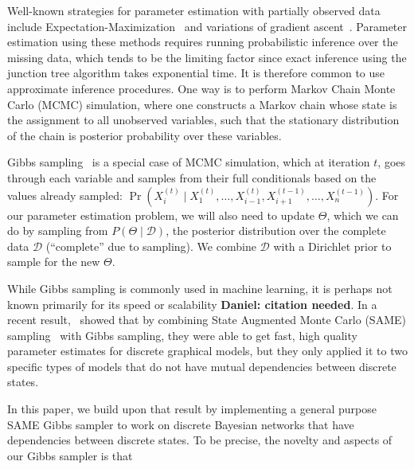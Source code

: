 \documentclass{article} %
\begin{document}
Well-known strategies for parameter estimation with partially observed data include
Expectation-Maximization~\citep{EMpaper} and variations of gradient ascent~\citep{Thiesson95}.
Parameter estimation using these methods requires running probabilistic inference over the missing
data, which tends to be the limiting factor since  exact inference using the junction tree algorithm
takes exponential time. It is therefore common to use approximate inference procedures.  One way is
to perform Markov Chain Monte Carlo (MCMC) simulation, where one constructs a Markov chain whose
state is the assignment to all unobserved variables, such that the stationary distribution of the
chain is posterior probability over these variables.

Gibbs sampling~\citep{Geman1984} is a special case of MCMC simulation, which at iteration $t$, goes
through each variable and samples from their full conditionals based on the values already sampled:
$\Pr(X_i^{(t)} \mid X_1^{(t)}, \ldots, X_{i-1}^{(t)}, X_{i+1}^{(t-1)}, \ldots, X_n^{(t-1)})$. For
our parameter estimation problem, we will also need to update $\Theta$, which we can do by sampling
from $P(\Theta \mid \mathcal{D})$, the posterior distribution over the complete data $\mathcal{D}$
(``complete'' due to sampling). We combine $\mathcal{D}$ with a Dirichlet prior to sample for the
new $\Theta$.

While Gibbs sampling is commonly used in machine learning, it is perhaps not known primarily for its
speed or scalability \textbf{Daniel: citation needed}. In a recent result,~\citet{SAME2015} showed
that by combining State Augmented Monte Carlo (SAME) sampling~\citep{SAME2002} with Gibbs sampling,
they were able to get fast, high quality parameter estimates for discrete graphical models, but they
only applied it to two specific types of models that do not have mutual dependencies between
discrete states.

In this paper, we build upon that result by implementing a general purpose SAME Gibbs sampler to
work on discrete Bayesian networks that have dependencies between discrete states. To be precise,
the novelty and aspects of our Gibbs sampler is that
\end{document}
